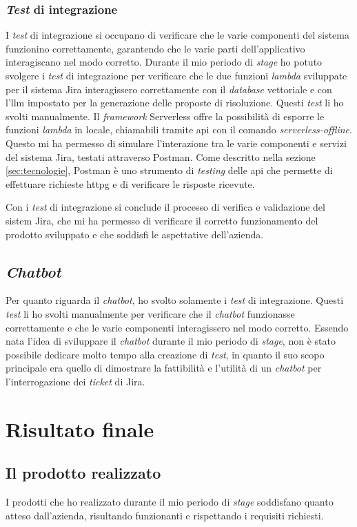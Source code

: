 \subsubsection{\textit{Test} di integrazione}
I \textit{test} di integrazione si occupano di verificare che le varie componenti del sistema funzionino correttamente, garantendo che le varie parti dell'applicativo interagiscano nel modo corretto. Durante il mio periodo di \textit{stage} ho potuto svolgere i \textit{test} di integrazione per verificare che le due funzioni \textit{lambda} sviluppate per il sistema Jira interagissero correttamente con il \textit{database} vettoriale e con l'\gls{llm} impostato per la generazione delle proposte di risoluzione. 
Questi \textit{test} li ho svolti manualmente. Il \textit{framework} Serverless offre la possibilità di esporre le funzioni \textit{lambda} in locale, chiamabili tramite \gls{api} con il comando \textit{serverless-offline}. Questo mi ha permesso di simulare l'interazione tra le varie componenti e servizi del sistema Jira, testati attraverso Postman. Come descritto nella sezione \ref{sec:tecnologie}, Postman è uno strumento di \textit{testing} delle \gls{api} che permette di effettuare richieste \gls{httpg} e di verificare le risposte ricevute.

\noindent
Con i \textit{test} di integrazione si conclude il processo di verifica e validazione del sistem Jira, che mi ha permesso di verificare il corretto funzionamento del prodotto sviluppato e che soddisfi le aspettative dell'azienda.

\subsection{\textit{Chatbot}}
Per quanto riguarda il \textit{chatbot}, ho svolto solamente i \textit{test} di integrazione. Questi \textit{test} li ho svolti manualmente per verificare che il \textit{chatbot} funzionasse correttamente e che le varie componenti interagissero nel modo corretto.
Essendo nata l'idea di sviluppare il \textit{chatbot} durante il mio periodo di \textit{stage}, non è stato possibile dedicare molto tempo alla creazione di \textit{test}, in quanto il suo scopo principale era quello di dimostrare la fattibilità e l'utilità di un \textit{chatbot} per l'interrogazione dei \textit{ticket} di Jira.
\section{Risultato finale}
\subsection{Il prodotto realizzato}
I prodotti che ho realizzato durante il mio periodo di \textit{stage} soddisfano quanto atteso dall'azienda, risultando funzionanti e rispettando i requisiti richiesti. 
